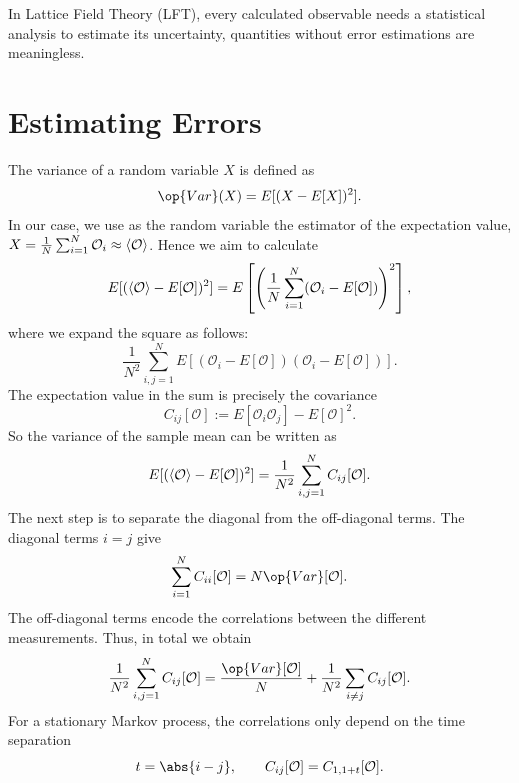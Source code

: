 In Lattice Field Theory (LFT), every calculated observable needs a statistical analysis to estimate its uncertainty, quantities without error
estimations are meaningless. 
\section{Estimating Errors}
The variance of a random variable $X$ is defined as
\begin{equation}
    \op{Var}(X) = E[(X - E[X])^2].
\end{equation}
In our case, we use as the random variable the estimator of the expectation value, $X = \frac{1}{N}\sum_{i=1}^N \mathcal{O}_i \approx \braket{\mathcal{O}}$. Hence we aim to calculate
\begin{equation}
    E[(\braket{\mathcal{O}} - E[\mathcal{O}])^2] = E \left[ \left( \frac{1}{N} \sum_{i=1}^N ( \mathcal{O}_i - E[\mathcal{O}])\right)^2 \right], 
\end{equation}
where we expand the square as follows: 
\begin{equation}
    \frac{1}{N^2} \sum_{i, j = 1}^N E[(\mathcal{O}_i - E[\mathcal{O}])(\mathcal{O}_i - E[\mathcal{O}])]. 
\end{equation}
The expectation value in the sum is precisely the covariance
\begin{equation}
    C_{ij}[\mathcal{O}] := E[\mathcal{O}_i \mathcal{O}_j] - E[\mathcal{O}]^2. 
\end{equation}
So the variance of the sample mean can be written as
\begin{equation}
    E[(\braket{\mathcal{O}} - E[\mathcal{O}])^2] = \frac{1}{N^2} \sum_{i, j = 1}^N C_{ij}[\mathcal{O}]. 
\end{equation}
The next step is to separate the diagonal from the off-diagonal terms. The diagonal terms $i = j$ give
\begin{equation}
    \sum_{i = 1}^N C_{ii}[\mathcal{O}] = N \op{Var}[\mathcal{O}]. 
\end{equation}
The off-diagonal terms encode the correlations between the different measurements. Thus, in total we obtain
\begin{equation}
    \frac{1}{N^2}\sum_{i, j=1}^N C_{ij}[\mathcal{O}] = \frac{\op{Var}[\mathcal{O}]}{N} + \frac{1}{N^2}\sum_{i \neq j} C_{ij}[\mathcal{O}]. 
\end{equation}
For a stationary Markov process, the correlations only depend on the time separation
\begin{equation}
    t = \abs{i -j}, \qquad C_{ij}[\mathcal{O}] = C_{1, 1 + t}[\mathcal{O}]. 
\end{equation}
